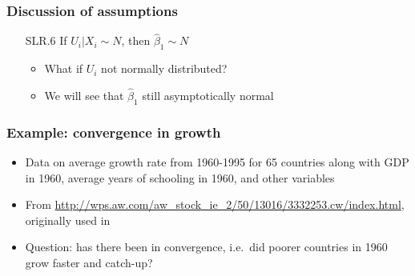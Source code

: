 \begin{frame}[allowframebreaks]
  \frametitle{Discussion of assumptions}
  \begin{itemize}
  \item[SLR.6] If $U_i|X_i \sim N$, then $\hat{\beta}_1 \sim N$
    \begin{itemize}
    \item What if $U_i$ not normally distributed?
    \item We will see that $\hat{\beta}_1$ still asymptotically normal
    \end{itemize}
  \end{itemize}
\end{frame}








\begin{frame}\frametitle{Example: convergence in growth}
  \begin{itemize}
  \item Data on average growth rate from 1960-1995 for 65 countries
    along with GDP in 1960, average years of schooling in 1960, and
    other variables
  \item From
    \url{http://wps.aw.com/aw_stock_ie_2/50/13016/3332253.cw/index.html},
    originally used in \cite{beck2000}
  \item Question: has there been in convergence, i.e.\ did poorer
    countries in 1960 grow faster and catch-up?    
  \end{itemize}
\end{frame}

